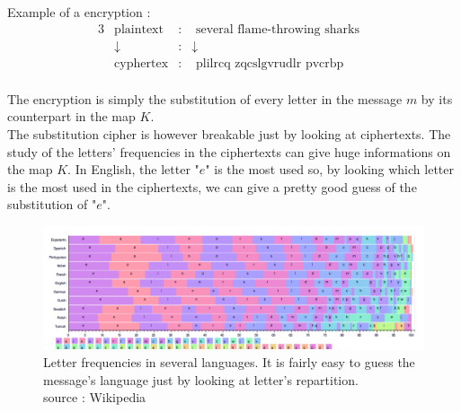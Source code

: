 \begin{table}[ht!]
    \centering
	\caption{Substitution table}
	\label{tab:SubstitionTable}
\end{table}

Example of a encryption : 
\begin{alignat*}{3}
    &\text{plaintext}   & : & \text{ several flame-throwing sharks}&  \\
    & \downarrow        & : &   \downarrow & \\
    &\text{cyphertex}   & : & \text{ plilrcq   zqcslgvrudlr pvcrbp}&  \\ 
\end{alignat*}


The encryption is simply the substitution of every letter in the message $m$ by its counterpart in the map $K$.\\
The substitution cipher is however breakable just by looking at ciphertexts. The study of the letters' frequencies in the ciphertexts can give huge informations on the map $K$. In English, the letter "$e$" is the most used so, by looking which letter is the most used in the ciphertexts, we can give a pretty good guess of the substitution of "$e$".\\

\begin{figure}[ht!]
    \centering
		\includegraphics[width=\textwidth]{images/letter_frequency}
	\caption{Letter frequencies in several languages. It is fairly easy to guess the message's language just by looking at letter's repartition. \\ source : Wikipedia}
	\label{fig:LetterFrequency}
\end{figure}


